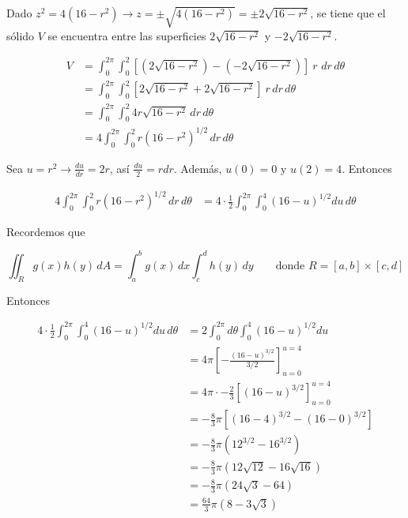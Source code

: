 \documentclass[12pt]{exam}
\begin{document}
\begin{questions}
  Dado $z^2=4(16-r^2) \rightarrow z = \pm \sqrt{4(16-r^2)}=\pm 2\sqrt{16-r^2}$, se tiene que el sólido $V$ se encuentra entre las superficies $2\sqrt{16-r^2}$ y $-2\sqrt{16-r^2}$. 

  
  \begin{align*}
    V
    &=\int_0^{2\pi}\int_0^2 \left[(2\sqrt{16-r^2})-(-2\sqrt{16-r^2})\right]~r\,\,dr\,d\theta \\
    &=\int_0^{2\pi}\int_0^2 \left[2\sqrt{16-r^2}+2\sqrt{16-r^2}\right]~r\,dr\,d\theta \\
    &=\int_0^{2\pi}\int_0^2 4r\sqrt{16-r^2}\,dr\,d\theta \\
    &=4 \int_0^{2\pi}\int_0^2 r(16-r^2)^{1/2} \,dr\,d\theta 
  \end{align*}

  Sea $u=r^2 \rightarrow \frac{du}{dr}=2r$, así $\frac{du}{2}=rdr$. Además, $u(0)=0$ y $u(2)=4$. Entonces

  \begin{align*}    
    4 \int_0^{2\pi}\int_0^2 r(16-r^2)^{1/2} \,dr\,d\theta
    &= 4\cdot \frac{1}{2}\int_0^{2\pi}\int_0^4 (16-u)^{1/2}du\,d\theta
  \end{align*}

  Recordemos que

  \begin{tcolorbox}[colback=white, colframe=blue!40!black]
    \begin{equation}
      \iint_R g(x)h(y)\,dA = \int_a^b g(x)\,dx \int_c^d h(y)\,dy \qquad \text{donde }R=[a,b]\times[c,d]
    \end{equation}
  \end{tcolorbox}

  Entonces
  
  \begin{align*}
    4\cdot \frac{1}{2}\int_0^{2\pi}\int_0^4 (16-u)^{1/2}du\,d\theta
    &= 2 \int_0^{2\pi}d\theta\int_0^4 (16-u)^{1/2}du \\
    &= 4\pi \left[-\frac{(16-u)^{3/2}}{3/2} \right]_{u=0}^{u=4} \\
    &= 4\pi \cdot -\frac{2}{3}\left[(16-u)^{3/2} \right]_{u=0}^{u=4} \\
    &= -\frac{8}{3}\pi \left[(16-4)^{3/2} - (16-0)^{3/2}\right] \\
    &= -\frac{8}{3}\pi \left(12^{3/2} - 16^{3/2}\right) \\
    &= -\frac{8}{3}\pi \left(12\sqrt{12} - 16\sqrt{16}\right) \\
    &= -\frac{8}{3}\pi \left(24\sqrt{3} - 64\right) \\
    &= \frac{64}{3}\pi \left(8-3\sqrt{3}\right) 
  \end{align*}


\end{questions}
\end{document}
